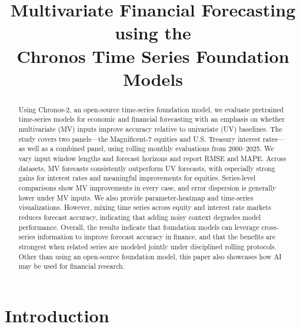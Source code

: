 \documentclass[twocolumn]{article}
\begin{document}

\title{Multivariate Financial Forecasting using the \\Chronos Time Series Foundation Models}

\maketitle


\begin{abstract}
Using Chronos-2, an open-source time-series foundation model, we evaluate pretrained time-series models for economic and financial forecasting with an emphasis on whether multivariate (MV) inputs improve accuracy relative to univariate (UV) baselines. The study covers two panels---the Magnificent-7 equities and U.S. Treasury interest rates---as well as a combined panel, using rolling monthly evaluations from 2000--2025. We vary input window lengths and forecast horizons and report RMSE and MAPE. Across datasets, MV forecasts consistently outperform UV forecasts, with especially strong gains for interest rates and meaningful improvements for equities. Series-level comparisons show MV improvements in every case, and error dispersion is generally lower under MV inputs. We also provide parameter-heatmap and time-series visualizations. However, mixing time series across equity and interest rate markets reduces forecast accuracy, indicating that adding noisy context degrades model performance. Overall, the results indicate that foundation models can leverage cross-series information to improve forecast accuracy in finance, and that the benefits are strongest when related series are modeled jointly under disciplined rolling protocols. Other than using an open-source foundation model, this paper also  showcases how AI may be used for financial research. 
\end{abstract}


\section{Introduction}
\end{document}
